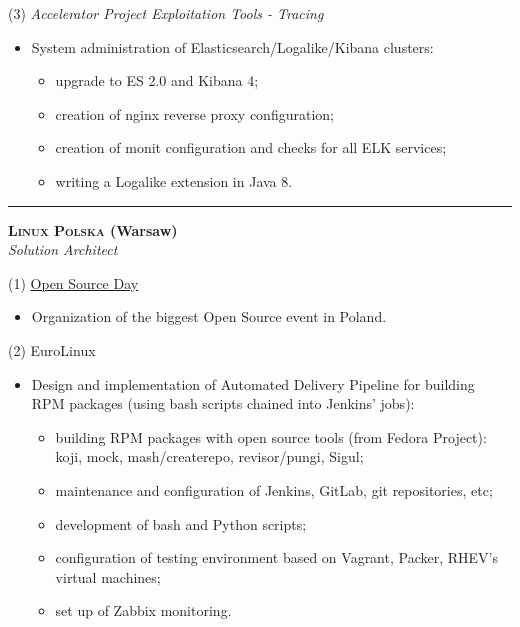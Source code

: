 \documentclass[$fontsize$, a4paper]{article}
\newcommand{\note}[1]{\marginnote{\scriptsize #1}}
\begin{document}
\vspace{10pt}
(3) \emph{Accelerator Project Exploitation Tools - Tracing}
\begin{itemize}
  \item System administration of Elasticsearch/Logalike/Kibana clusters:
  \begin{itemize}
    \item upgrade to ES 2.0 and Kibana 4;
    \item creation of nginx reverse proxy configuration;
    \item creation of monit configuration and checks for all ELK services;
    \item writing a Logalike extension in Java 8.
  \end{itemize}
\end{itemize}


\noindent\rule[0.5ex]{\linewidth}{1pt}

\note{02/2014--03/2015}\textbf{\textsc{Linux Polska} (Warsaw)}\\
\emph{Solution Architect}

\vspace{10pt}
(1) \href{http://opensourceday.com/}{Open Source Day}
\begin{itemize}
  \item Organization of the biggest Open Source event in Poland.
\end{itemize}

(2) EuroLinux
\begin{itemize}
  \item Design and implementation of Automated Delivery Pipeline for building RPM packages (using bash scripts chained into Jenkins' jobs):

  \begin{itemize}
  \item building RPM packages with open source tools (from Fedora Project):
  koji, mock, mash/createrepo, revisor/pungi, Sigul;
  \item maintenance and configuration of Jenkins, GitLab, git repositories, etc;
  \item development of bash and Python scripts;
  \item configuration of testing environment based on Vagrant, Packer, RHEV's virtual machines;
  \item set up of Zabbix monitoring.
  \end{itemize}

\end{itemize}
\end{document}
